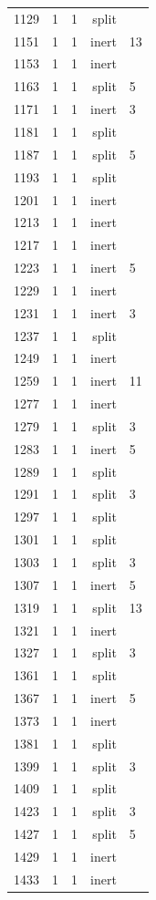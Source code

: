 \begin{longtable}{rrrrl}
1129 & 1 & 1 & split &  \\
1151 & 1 & 1 & inert & 13 \\
1153 & 1 & 1 & inert &  \\
1163 & 1 & 1 & split & 5 \\
1171 & 1 & 1 & inert & 3 \\
1181 & 1 & 1 & split &  \\
1187 & 1 & 1 & split & 5 \\
1193 & 1 & 1 & split &  \\
1201 & 1 & 1 & inert &  \\
1213 & 1 & 1 & inert &  \\
1217 & 1 & 1 & inert &  \\
1223 & 1 & 1 & inert & 5 \\
1229 & 1 & 1 & inert &  \\
1231 & 1 & 1 & inert & 3 \\
1237 & 1 & 1 & split &  \\
1249 & 1 & 1 & inert &  \\
1259 & 1 & 1 & inert & 11 \\
1277 & 1 & 1 & inert &  \\
1279 & 1 & 1 & split & 3 \\
1283 & 1 & 1 & inert & 5 \\
1289 & 1 & 1 & split &  \\
1291 & 1 & 1 & split & 3 \\
1297 & 1 & 1 & split &  \\
1301 & 1 & 1 & split &  \\
1303 & 1 & 1 & split & 3 \\
1307 & 1 & 1 & inert & 5 \\
1319 & 1 & 1 & split & 13 \\
1321 & 1 & 1 & inert &  \\
1327 & 1 & 1 & split & 3 \\
1361 & 1 & 1 & split &  \\
1367 & 1 & 1 & inert & 5 \\
1373 & 1 & 1 & inert &  \\
1381 & 1 & 1 & split &  \\
1399 & 1 & 1 & split & 3 \\
1409 & 1 & 1 & split &  \\
1423 & 1 & 1 & split & 3 \\
1427 & 1 & 1 & split & 5 \\
1429 & 1 & 1 & inert &  \\
1433 & 1 & 1 & inert &  \\

\end{longtable}
